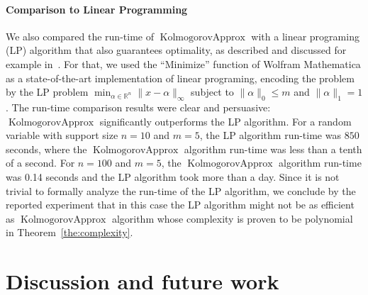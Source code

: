 \documentclass{article}
\DeclareMathOperator{\KlmApprox}{KolmogorovApprox}
\begin{document}
	
	\paragraph{Comparison to Linear Programming}
	
	We also compared the run-time of $\KlmApprox$ with a linear programing (LP) algorithm that also guarantees optimality, as described and discussed for example in~\cite{pavlikov2016cvar}.
	For that, we used the ``Minimize'' function of Wolfram Mathematica as a  state-of-the-art implementation of linear programing, encoding the problem by the LP problem $\min_{\alpha \in \mathbb{R}^n} \| x - \alpha\|_\infty$ subject to $\|\alpha\|_0 \leq m$ and $\| \alpha \|_1 =1$.
	The run-time comparison results were clear and persuasive: $\KlmApprox$ significantly outperforms the LP algorithm. For a random variable with support size $n=10$ and $m=5$, the LP algorithm run-time was $850$ seconds, where the $\KlmApprox$ algorithm run-time was less than a tenth of a second. For $n=100$ and $m=5$, the $\KlmApprox$ algorithm run-time was 0.14 seconds and the LP algorithm took more than a day. 
	Since it is not trivial to formally analyze the run-time of the LP algorithm, we conclude by the reported experiment that in this case the LP algorithm might not be as efficient as $\KlmApprox$ algorithm whose complexity is proven to be polynomial in Theorem~\ref{the:complexity}.
	
	\section{Discussion and future work}\label{sec:discussion}
	
\end{document}
